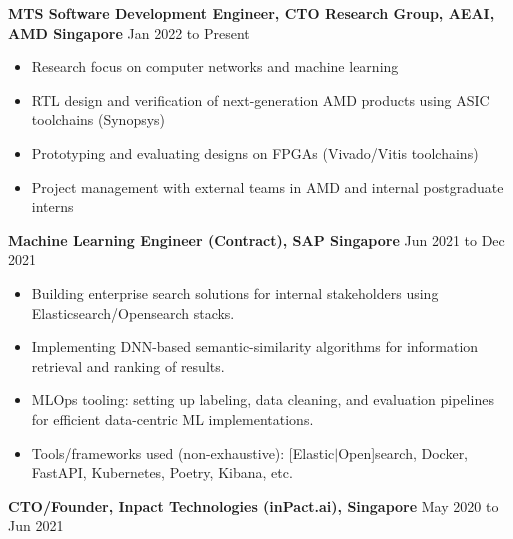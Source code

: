 \documentclass[10pt]{article}
\newenvironment{myinnerlist}[1][\enskip\textbullet]%
        {\begin{itemize}[#1,leftmargin=*,parsep=0pt,itemsep=3pt,topsep=0pt,partopsep=0pt]}
        {\end{itemize}\vspace{.6\baselineskip}}
\newcommand{\localtextbulletone}{\textcolor{gray}{\raisebox{.45ex}{\rule{.8ex}{.8ex}}}}
\begin{document}
{
    \hspace*{-\marginparsep minus \marginparwidth}%
    \begin{minipage}[t]{\textwidth+\marginparwidth+\marginparsep}%

        \textbf{MTS Software Development Engineer, CTO Research Group, AEAI, AMD Singapore} \hfill {Jan 2022 to Present}

        \vspace{0.1in}
        \begin{myinnerlist}
            \renewcommand{\labelitemi}{\localtextbulletone}

            \item Research focus on computer networks and machine learning
            \item RTL design and verification of next-generation AMD products using ASIC toolchains (Synopsys)
            \item Prototyping and evaluating designs on FPGAs (Vivado/Vitis toolchains)
            \item Project management with external teams in AMD and internal postgraduate interns

        \end{myinnerlist}

        \textbf{Machine Learning Engineer (Contract), SAP Singapore} \hfill {Jun 2021 to Dec 2021}

        \vspace{0.1in}
        \begin{myinnerlist}
            \renewcommand{\labelitemi}{\localtextbulletone}

            \item Building enterprise search solutions for internal stakeholders using Elasticsearch/Opensearch stacks.
            \item Implementing DNN-based semantic-similarity algorithms for information retrieval and ranking of results.
            \item MLOps tooling: setting up labeling, data cleaning, and evaluation pipelines for efficient data-centric ML implementations.
            \item Tools/frameworks used (non-exhaustive): [Elastic$\vert$Open]search, Docker, FastAPI, Kubernetes, Poetry, Kibana, etc.

        \end{myinnerlist}

        \textbf{CTO/Founder, Inpact Technologies (inPact.ai), Singapore} \hfill {May 2020 to Jun 2021}


\end{minipage}}
\end{document}
